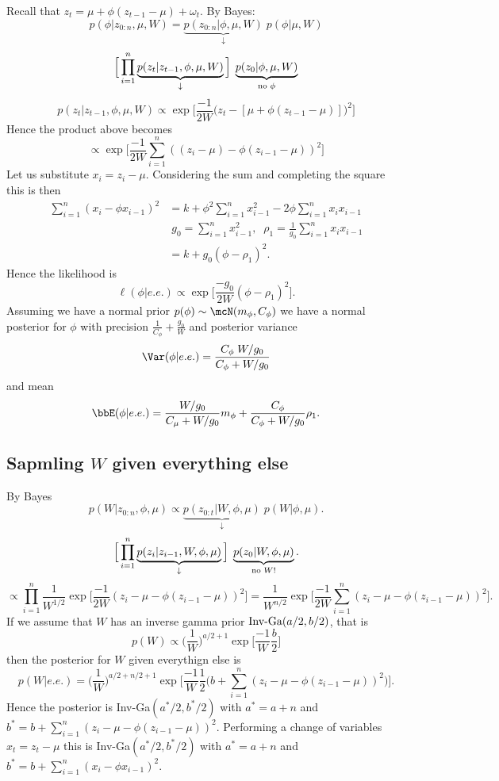 \documentclass{article}
\begin{document}
Recall that $z_t = \mu + \phi (z_{t-1} - \mu) + \omega_t$.  By Bayes:
\[
p(\phi | z_{0:n}, \mu, W) = 
\underbrace{p(z_{0:n} | \phi, \mu, W)}_{\downarrow}
\;  p(\phi | \mu, W)
\]
\[
\Big[ \prod_{i=1}^n \underbrace{p(z_t | z_{t-1}, \phi, \mu, W)}_{\downarrow} \Big]
\; \underbrace{ p(z_0 | \phi, \mu, W)}_{\textmd{no $\phi$}}
\]
\[
p(z_t | z_{t-1}, \phi, \mu, W) \propto \exp \Big[ \frac{-1}{2W} \Big( z_t - [\mu + \phi (z_{t-1} - \mu)] \Big)^2 \Big]
\]
Hence the product above becomes
\[
\propto \exp \Big[ \frac{-1}{2W} \sum_{i=1}^n ( (z_i - \mu) - \phi(z_{i-1} - \mu))^2 \Big]
\]
Let us substitute $x_i = z_i - \mu$.
Considering the sum and completing the square this is then
\begin{align*}
\sum_{i=1}^n (x_i - \phi x_{i-1})^2 
& = k + \phi^2 \sum_{i=1}^n x_{i-1}^2 - 2 \phi \sum_{i=1}^n x_i x_{i-1} \\
& \; g_0 = \sum_{i=1}^n x_{i-1}^2, \;\;   
\rho_1 = \frac{1}{g_0} \sum_{i=1}^n x_i x_{i-1} \\
& = k + g_0 ( \phi - \rho_1 )^2.
\end{align*}
Hence the likelihood is
\[
\ell(\phi | e.e.) \propto \exp \Big[ \frac{-g_0}{2W} (\phi - \rho_1)^2 \Big].
\]
Assuming we have a normal prior $p(\phi) \sim \mcN(m_\phi, C_\phi)$ we have a normal posterior for $\phi$ with precision $\frac{1}{C_\phi} + \frac{g_0}{W}$ and posterior variance
\[
\Var(\phi | e.e.) = \frac{C_\phi \; W/g_0}{C_\phi + W/g_0}
\]
and mean
\[
\bbE(\phi | e.e.) = \frac{W/g_0}{C_\mu + W/g_0} m_\phi + \frac{C_\phi}{C_\phi + W/g_0} \rho_1.
\]

\subsection{Sapmling $W$ given everything else}

By Bayes
\[
p(W | z_{0:n}, \phi, \mu) 
\propto 
\underbrace{p(z_{0:t} | W, \phi, \mu)}_{\downarrow} \; p(W | \phi, \mu).
\]
\[
\Big[ \prod_{i=1}^n 
\underbrace{p(z_i | z_{i-1}, W, \phi, \mu)}_{\downarrow} \Big]
\; \underbrace{p(z_0 | W, \phi, \mu)}_{\textmd{no $W$!}}.
\]
\[
\propto \prod_{i=1}^n \frac{1}{W^{1/2}} \exp \Big[ \frac{-1}{2W} (z_i - \mu - \phi (z_{i-1} - \mu) )^2 \Big]
= \frac{1}{W^{n/2}} \exp \Big[ \frac{-1}{2W} \sum_{i=1}^n (z_i - \mu - \phi(z_{i-1} - \mu) )^2 \Big].
\]
If we assume that $W$ has an inverse gamma prior $\textmd{Inv-Ga}(a/2, b/2)$, that is
\[
p(W) \propto \Big(\frac{1}{W} \Big)^{a/2 + 1} \exp \Big[ \frac{-1}{W} \frac{b}{2} \Big]
\]
then the posterior for $W$ given everythign else is
\[
p(W | e.e.) = \Big( \frac{1}{W} \Big)^{a/2 + n/2 + 1} 
\exp \Big[ \frac{-1}{W} \frac{1}{2} \Big( b + \sum_{i=1}^n (z_i - \mu - \phi (z_{i-1} - \mu))^2 \Big) \Big].
\]
Hence the posterior is Inv-Ga$(a^*/2, b^*/2)$ with $a^* = a + n$ and $b^* = b + \sum_{i=1}^n (z_i - \mu - \phi (z_{i-1} - \mu))^2$.  Performing a change of variables $x_t = z_t - \mu$ this is Inv-Ga$(a^*/2, b^*/2)$ with $a^* = a + n$ and $b^* = b + \sum_{i=1}^n (x_i - \phi x_{i-1})^2$.  
\end{document}
